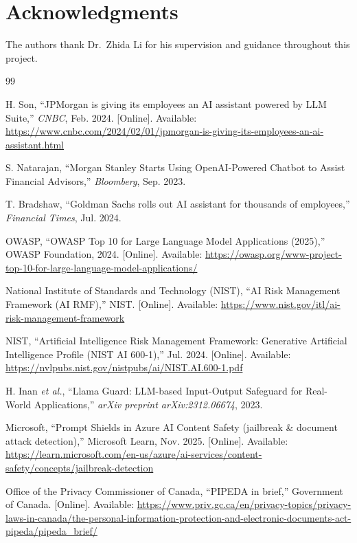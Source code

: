 \documentclass[journal]{IEEEtran}
\begin{document}
\section*{Acknowledgments}
The authors thank Dr.\ Zhida Li for his supervision and guidance throughout this project.


\begin{thebibliography}{99}

H. Son, ``JPMorgan is giving its employees an AI assistant powered by LLM Suite,'' \textit{CNBC}, Feb. 2024. [Online]. Available: \url{https://www.cnbc.com/2024/02/01/jpmorgan-is-giving-its-employees-an-ai-assistant.html}

S. Natarajan, ``Morgan Stanley Starts Using OpenAI-Powered Chatbot to Assist Financial Advisors,'' \textit{Bloomberg}, Sep. 2023.

T. Bradshaw, ``Goldman Sachs rolls out AI assistant for thousands of employees,'' \textit{Financial Times}, Jul. 2024.

OWASP, ``OWASP Top 10 for Large Language Model Applications (2025),'' OWASP Foundation, 2024. [Online]. Available: \url{https://owasp.org/www-project-top-10-for-large-language-model-applications/}

National Institute of Standards and Technology (NIST), ``AI Risk Management Framework (AI RMF),'' NIST. [Online]. Available: \url{https://www.nist.gov/itl/ai-risk-management-framework}

NIST, ``Artificial Intelligence Risk Management Framework: Generative Artificial Intelligence Profile (NIST AI 600-1),'' Jul. 2024. [Online]. Available: \url{https://nvlpubs.nist.gov/nistpubs/ai/NIST.AI.600-1.pdf}

H. Inan \textit{et al.}, ``Llama Guard: LLM-based Input-Output Safeguard for Real-World Applications,'' \textit{arXiv preprint arXiv:2312.06674}, 2023.

Microsoft, ``Prompt Shields in Azure AI Content Safety (jailbreak \& document attack detection),'' Microsoft Learn, Nov. 2025. [Online]. Available: \url{https://learn.microsoft.com/en-us/azure/ai-services/content-safety/concepts/jailbreak-detection}

Office of the Privacy Commissioner of Canada, ``PIPEDA in brief,'' Government of Canada. [Online]. Available: \url{https://www.priv.gc.ca/en/privacy-topics/privacy-laws-in-canada/the-personal-information-protection-and-electronic-documents-act-pipeda/pipeda_brief/}


\end{thebibliography}
\end{document}
